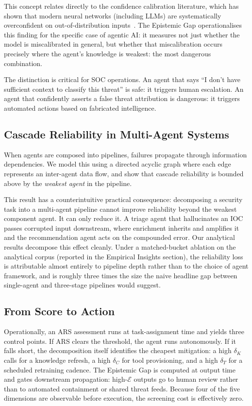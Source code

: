 This concept relates directly to the confidence calibration literature, which
has shown that modern neural networks (including LLMs) are systematically
overconfident on out-of-distribution inputs~\cite{guo2017calibration}. The
Epistemic Gap operationalises this finding for the specific case of agentic
AI: it measures not just whether the model is miscalibrated in general, but
whether that miscalibration occurs precisely where the agent's knowledge is
weakest: the most dangerous combination.

The distinction is critical for SOC operations. An agent that says
``I don't have sufficient context to classify this threat'' is safe: it
triggers human escalation. An agent that confidently asserts a false threat
attribution is dangerous: it triggers automated actions based on fabricated
intelligence.

\subsection{Cascade Reliability in Multi-Agent Systems}

When agents are composed into pipelines, failures propagate through
information dependencies. We model this using a directed acyclic graph
where each edge represents an inter-agent data flow, and show that cascade
reliability is bounded above by the \textit{weakest agent} in the pipeline.

This result has a counterintuitive practical consequence: decomposing
a security task into a multi-agent pipeline cannot improve reliability
beyond the weakest component agent. It can only reduce it. A triage agent
that hallucinates an IOC passes corrupted input downstream, where
enrichment inherits and amplifies it and the recommendation agent acts
on the compounded error. Our analytical results decompose this effect
cleanly. Under a matched-bucket ablation on the analytical corpus
(reported in the Empirical Insights section),
the reliability loss is attributable almost entirely to pipeline depth
rather than to the choice of agent framework, and is roughly three
times the size the naive headline gap between single-agent and
three-stage pipelines would suggest.

\subsection{From Score to Action}

Operationally, an ARS assessment runs at task-assignment time and
yields three control points. If ARS clears the threshold, the agent
runs autonomously. If it falls short, the decomposition itself
identifies the cheapest mitigation: a high $\delta_K$ calls for a
knowledge refresh, a high $\delta_C$ for tool provisioning, and a
high $\delta_T$ for a scheduled retraining cadence. The Epistemic
Gap is computed at output time and gates downstream propagation:
high-$\mathcal{E}$ outputs go to human review rather than to
automated containment or shared threat feeds. Because four of the
five dimensions are observable before execution, the screening cost
is effectively zero.
